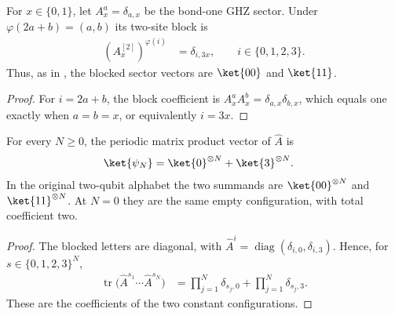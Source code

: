\begin{lemma}
    \label{thm:mpug_czx_blocked_ghz_sectors}
    \leanok
    For $x\in\{0,1\}$, let $A_x^a=\delta_{a,x}$ be the
    bond-one GHZ sector. Under $\varphi(2a+b)=(a,b)$ its two-site block is
    \begin{align}
        (A_x^{[2]})^{\varphi(i)} & =\delta_{i,3x},
        \qquad i\in\{0,1,2,3\}.
    \end{align}
    Thus, as in \cite[lines~4660--4670]{FrancoRubio2025MPUGauging}, the
    blocked sector vectors are $\ket{00}$ and $\ket{11}$.
\end{lemma}

\begin{proof}\leanok
    For $i=2a+b$, the block coefficient is
    $A_x^aA_x^b=\delta_{a,x}\delta_{b,x}$, which equals one exactly when
    $a=b=x$, or equivalently $i=3x$.
\end{proof}

\begin{lemma}
    \label{thm:mpug_czx_blocked_ghz_mpv}
    \leanok
    For every $N\geq0$, the periodic matrix product vector of
    $\widehat A$ is
    \begin{align}
        \ket{\psi_N}
         & =\ket{0}^{\otimes N}+\ket{3}^{\otimes N}.
        \label{eq:mpug_czx_blocked_ghz_mpv}
    \end{align}
    In the original two-qubit alphabet the two summands are
    $\ket{00}^{\otimes N}$ and $\ket{11}^{\otimes N}$.
    At $N=0$ they are the same empty configuration, with total coefficient
    two.
\end{lemma}

\begin{proof}\leanok
    The blocked letters are diagonal, with
    $\widehat A^i=\operatorname{diag}(\delta_{i,0},\delta_{i,3})$.
    Hence, for $s\in\{0,1,2,3\}^N$,
    \begin{align}
        \operatorname{tr}\bigl(\widehat A^{s_1}\cdots
        \widehat A^{s_N}\bigr)
         & =\prod_{j=1}^N\delta_{s_j,0}
        +\prod_{j=1}^N\delta_{s_j,3}.
    \end{align}
    These are the coefficients of the two constant configurations.
\end{proof}

